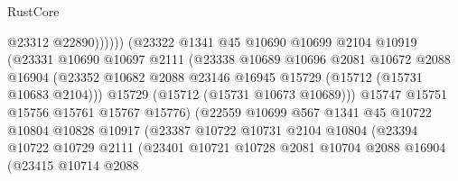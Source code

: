 \begin{lexlean}{RustCore}
\begin{coremodule}
                                        @23312
                                        @22890))))))
                            (@23322
                              @1341
                              @45
                              @10690
                              @10699
                              @2104
                              @10919
                              (@23331
                                @10690
                                @10697
                                @2111
                                (@23338
                                  @10689
                                  @10696
                                  @2081
                                  @10672
                                  @2088
                                  @16904
                                  (@23352
                                    @10682
                                    @2088
                                    @23146
                                    @16945
                                    @15729
                                    (@15712 (@15731 @10683 @2104)))
                                  @15729
                                  (@15712 (@15731 @10673 @10689)))
                                @15747
                                @15751
                                @15756
                                @15761
                                @15767
                                @15776)
                              (@22559
                                @10699
                                @567
                                @1341
                                @45
                                @10722
                                @10804
                                @10828
                                @10917
                                (@23387
                                  @10722
                                  @10731
                                  @2104
                                  @10804
                                  (@23394
                                    @10722
                                    @10729
                                    @2111
                                    (@23401
                                      @10721
                                      @10728
                                      @2081
                                      @10704
                                      @2088
                                      @16904
                                      (@23415
                                        @10714
                                        @2088

\end{coremodule}
\end{lexlean}
